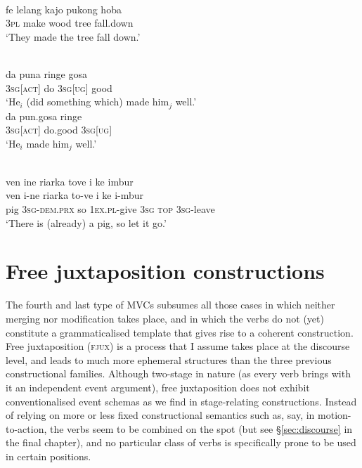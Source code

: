 \ea \label{Alorese_15}
\\
\gll fe lelang kajo pukong hoba \\
3\textsc{pl} make wood tree fall.down \\
\glft `They made the tree fall down.'\\ 
\z

\ea
{}\\
\ea \label{Buru_24}
\gll da puna ringe gosa \\
3\textsc{sg}[\textsc{act}] do 3\textsc{sg}[\textsc{ug}] good \\
\glft `He$_i$ (did something which) made him$_j$ well.' \\ 
\ex \label{Buru_25}
\gll da pun.gosa ringe \\ 
3\textsc{sg}[\textsc{act}] do.good 3\textsc{sg}[\textsc{ug}] \\
\glft `He$_i$ made him$_j$ well.'\\ 
\z
\z

\ea \label{Dusner_49}
\\
\glll ven ine riarka tove i ke imbur \\
ven i-ne riarka to-ve i ke i-mbur \\
pig 3\textsc{sg}-\textsc{dem}.\textsc{prx} so 1\textsc{ex}.\textsc{pl}-give 3\textsc{sg} \textsc{top} 3\textsc{sg}-leave \\
\glft `There is (already) a pig, so let it go.'\\
\z

\section{Free juxtaposition constructions} \label{sec:fjux}

The fourth and last type of MVCs subsumes all those cases in which neither merging nor modification takes place, and in which the verbs do not (yet) constitute a grammaticalised template that gives rise to a coherent construction. Free juxtaposition (\textsc{fjux}) is a process that I assume takes place at the discourse level, and leads to much more ephemeral structures than the three previous constructional families. Although two-stage in nature (as every verb brings with it an independent event argument), free juxtaposition does not exhibit conventionalised event schemas as we find in stage-relating constructions. Instead of relying on more or less fixed constructional semantics such as, say, in motion-to-action, the verbs seem to be combined on the spot (but see §\ref{sec:discourse} in the final chapter), and no particular class of verbs is specifically prone to be used in certain positions. 

